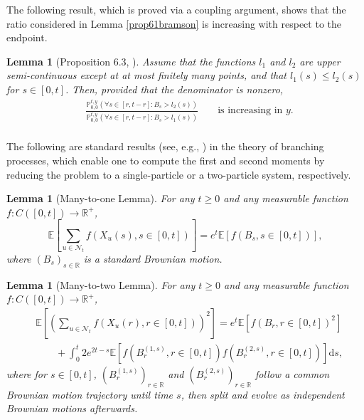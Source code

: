 \documentclass{article}
\newtheorem{lemma}[theorem]{Lemma}
\newcommand{\E}[0]{\mathbb{E}}
\newcommand{\Prob}{\mathbb{P}}
\begin{document}
The following result, which is proved via a coupling argument, shows that the ratio considered in Lemma \ref{prop61bramson} is increasing with respect to the endpoint.
\begin{lemma}[Proposition 6.3, \cite{Bramson1983ConvergenceOS}]\label{prop63bramson} Assume that the functions $l_1$ and $l_2$ are upper semi-continuous except at at most finitely many points, and that $l_1(s)\leq l_2(s)$ for $s\in [0,t]$. Then, provided that the denominator is nonzero,
\begin{equation}
      \begin{aligned}
               & \frac{\Prob_{0,0}^{t,y}( \forall s \in [r,t-r] : B_s > l_2(s))}{\Prob_{0,0}^{t,y}( \forall s \in [r,t-r] : B_s > l_1(s))}     & & \text{ is increasing in $y$.}\\
      \end{aligned}
    \end{equation}
\end{lemma}

The following are standard results (see, e.g., \cite{harris2014manytofew}) in the theory of branching processes, which enable one to compute the first and second moments by reducing the problem to a single-particle or a two-particle system, respectively.

\begin{lemma}[Many-to-one Lemma]
    For any $t\geq 0$ and any measurable function $f: C([0,t])  \rightarrow \mathbb{R^+}$,
\begin{equation*}
    \E\left[\sum_{u\in \mathcal{N}_t}f(X_u(s),s \in \left[0,t\right])\right]= e^t \E\left[ f(B_s, s\in \left[0,t\right] )\right],
\end{equation*}
where $(B_s)_{s\in \mathbb{R}}$ is a standard Brownian motion.
\end{lemma}


\begin{lemma}[Many-to-two Lemma]\label{manyto2}
    For any $t\geq 0$ and any measurable function $f: C([0,t])  \rightarrow \mathbb{R^+}$,
\begin{equation}
    \begin{split}
        &\E\left[ \left(\sum_{u\in \mathcal{N}_t}f(X_u(r),r \in \left[0,t\right])\right)^2 \right] = e^t \E\left[ f(B_r, r\in \left[0,t\right] )^2\right]\\
        & \qquad  + \int_0^t 2e^{2t-s}\E\left[ f(B^{(1,s)}_r, r\in \left[0,t\right])f(B^{(2,s)}_r, r\in \left[0,t\right])  \right]\mathrm{d}s,
    \end{split}
\end{equation}
where for $s \in \left[0,t\right]$, $(B^{(1,s)}_r)_{r\in \mathbb{R}}$ and $(B^{(2,s)}_r)_{r\in \mathbb{R}}$ follow a common Brownian motion trajectory until time $s$, then split and evolve as independent Brownian motions afterwards.
\end{lemma}
\end{document}
